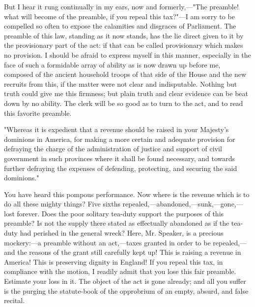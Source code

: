 But I hear it rung continually in my ears, now and formerly,—"The preamble! what will become of the preamble, if you repeal this tax?"—I am sorry to be compelled so often to expose the calamities and disgraces of Parliament. The preamble of this law, standing as it now stands, has the lie direct given to it by the provisionary part of the act: if that can be called provisionary which makes no provision. I should be afraid to express myself in this manner, especially in the face of such a formidable array of ability as is now drawn up before me, composed of the ancient household troops of that side of the House and the new recruits from this, if the matter were not clear and indisputable. Nothing but truth could give me this firmness; but plain truth and clear evidence can be beat down by no ability. The clerk will be so good as to turn to the act, and to read this favorite preamble.

"Whereas it is expedient that a revenue should be raised in your Majesty's dominions in America, for making a more certain and adequate provision for defraying the charge of the administration of justice and support of civil government in such provinces where it shall be found necessary, and towards further defraying the expenses of defending, protecting, and securing the said dominions."

You have heard this pompous performance. Now where is the revenue which is to do all these mighty things? Five sixths repealed,—abandoned,—sunk,—gone,—lost forever. Does the poor solitary tea-duty support the purposes of this preamble? Is not the supply there stated as effectually abandoned as if the tea-duty had perished in the general wreck? Here, Mr. Speaker, is a precious mockery:—a preamble without an act,—taxes granted in order to be repealed,—and the reasons of the grant still carefully kept up! This is raising a revenue in America! This is preserving dignity in England! If you repeal this tax, in compliance with the motion, I readily admit that you lose this fair preamble. Estimate your loss in it. The object of the act is gone already; and all you suffer is the purging the statute-book of the opprobrium of an empty, absurd, and false recital.

